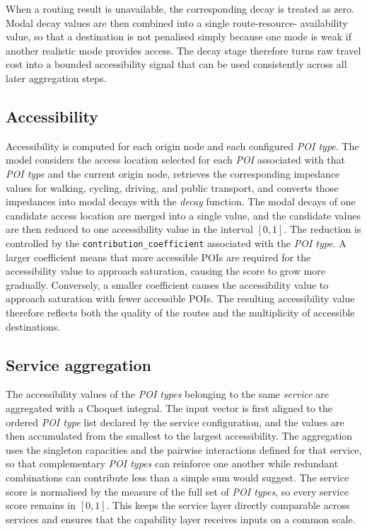 \documentclass{article}
\begin{document}
When a routing result is unavailable, the corresponding decay is treated as
zero. Modal decay values are then combined into a single route-resource-
availability value, so that a destination is not penalised simply because one
mode is weak if another realistic mode provides access. The decay stage
therefore turns raw travel cost into a bounded accessibility signal that can be
used consistently across all later aggregation steps.

\subsection{Accessibility}
Accessibility is computed for each origin node and each configured
\emph{POI type}. The model considers the access location selected for each \emph{POI}
associated with that \emph{POI type} and the current origin node, retrieves the corresponding impedance values for walking, cycling, driving, and public transport, and converts those impedances
into modal decays with the \emph{decay} function. The modal decays of one
candidate access location are merged into a single value, and the candidate
values are then reduced to one accessibility value in the interval \([0,1]\).
The reduction is controlled by the \texttt{contribution\_coefficient}
associated with the \emph{POI type}. A larger coefficient means that more accessible POIs are required for the accessibility value to approach saturation, causing the score to grow more
gradually. Conversely, a smaller coefficient causes the accessibility value
to approach saturation with fewer accessible POIs. The resulting accessibility value therefore reflects both the
quality of the routes and the multiplicity of accessible destinations.

\subsection{Service aggregation}
The accessibility values of the \emph{POI types} belonging to the same
\emph{service} are aggregated with a Choquet integral. The input vector is first
aligned to the ordered \emph{POI type} list declared by the service
configuration, and the values are then accumulated from the smallest to the
largest accessibility. The aggregation uses the singleton capacities and the
pairwise interactions defined for that service, so that complementary
\emph{POI types} can reinforce one another while redundant combinations can
contribute less than a simple sum would suggest.
The service score is normalised by the measure of the full set of
\emph{POI types}, so every service score remains in \([0,1]\). This keeps the
service layer directly comparable across services and ensures that the
capability layer receives inputs on a common scale.
\end{document}
